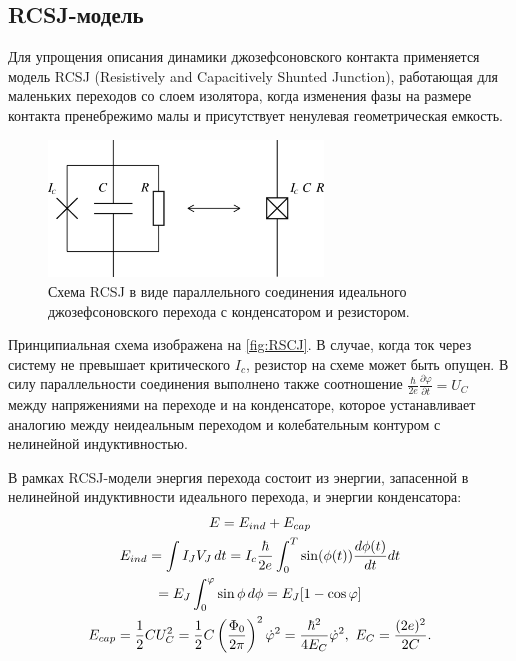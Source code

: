 \documentclass[12pt]{article}
\numberwithin{equation}{section}
\begin{document}
\subsection{RCSJ-модель}
Для упрощения описания динамики джозефсоновского контакта применяется модель RCSJ (Resistively and Capacitively Shunted Junction), работающая для маленьких переходов со слоем изолятора, когда изменения фазы на размере контакта пренебрежимо малы и присутствует ненулевая геометрическая емкость. 
\begin{figure}[h]
\centering
\includegraphics[width=0.65\textwidth]{Pictures/RCSJ.png}
\caption{Схема RCSJ в виде параллельного соединения идеального джозефсоновского перехода с конденсатором и резистором.}
\label{fig:RSCJ}
\end{figure}

Принципиальная схема изображена на \autoref{fig:RSCJ}. В случае, когда ток через систему не превышает критического $I_c$, резистор на схеме может быть опущен. В силу параллельности соединения выполнено также соотношение $\displaystyle \frac{\hbar}{2e}\frac{\partial\varphi}{\partial t} = U_C$ между напряжениями на переходе и на конденсаторе, которое устанавливает аналогию между неидеальным переходом и колебательным контуром с нелинейной индуктивностью.

В рамках RCSJ-модели энергия перехода состоит из энергии, запасенной в нелинейной индуктивности идеального перехода, и энергии конденсатора:
\begin{gather}
E = E_{ind}+E_{cap}  \label{eq:JJenrj1}\\
E_{ind} = \int I_JV_J\, dt = I_c \frac{\hbar}{2e}\int_0^T \sin(\phi(t))\frac{d\phi(t)}{dt}dt \notag\\
= E_J \int_0^\varphi \sin\phi\, d\phi = E_J [1-\cos\varphi] \\
E_{cap} = \frac{1}{2}C U_C^2 = \frac{1}{2} C \left(\frac{\Phi_0}{2\pi}\right)^2 \dot \varphi^2 = 
\frac{\hbar^2}{4E_C} \dot \varphi^2,\ E_C = \frac{(2e)^2}{2C}.
\label{eq:JJenrj2}
\end{gather}
\end{document}
